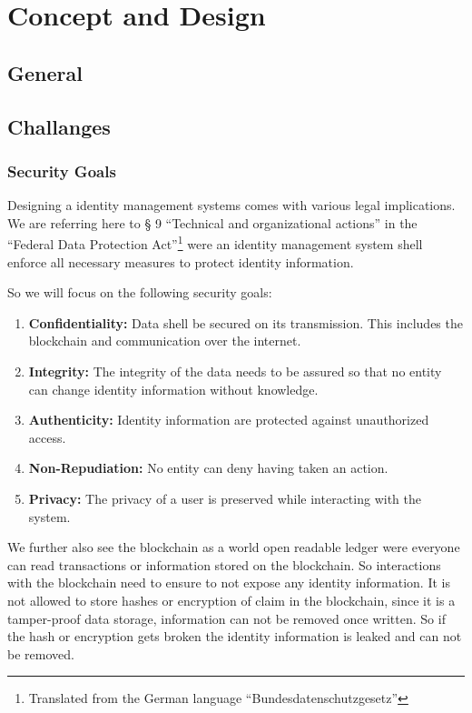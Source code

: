 \chapter{Concept and Design}
\label{cha:conceptanddesign}

\section{General}

\section{Challanges}
\label{sec:challanges}

\subsection{Security Goals}
\label{sec:securityGoals}

Designing a identity management systems comes with various legal implications. We are referring here to § 9 “Technical and organizational actions” in the “Federal Data Protection Act”\footnote{Translated from the German language “Bundesdatenschutzgesetz”} were an identity management system shell enforce all necessary measures to protect identity information.\cite{bdsg}

So we will focus on the following security goals:
\begin{enumerate}
\item \textbf{Confidentiality:} Data shell be secured on its transmission. This includes the blockchain and communication over the internet. 
\item \textbf{Integrity:} The integrity of the data needs to be assured so that no entity can change identity information without knowledge. 
\item \textbf{Authenticity:} Identity information are protected against unauthorized access. 
\item \textbf{Non-Repudiation:} No entity can deny having taken an action.
\item \textbf{Privacy:} The privacy of a user is preserved while interacting with the system. 
\end{enumerate}

We further also see the blockchain as a world open readable ledger were everyone can read transactions or information stored on the blockchain. So interactions with the blockchain need to ensure to not expose any identity information. 
It is not allowed to store hashes or encryption of claim in the blockchain, since it is a tamper-proof data storage, information can not be removed once written. So if the hash or encryption gets broken the identity information is leaked and can not be removed.  

